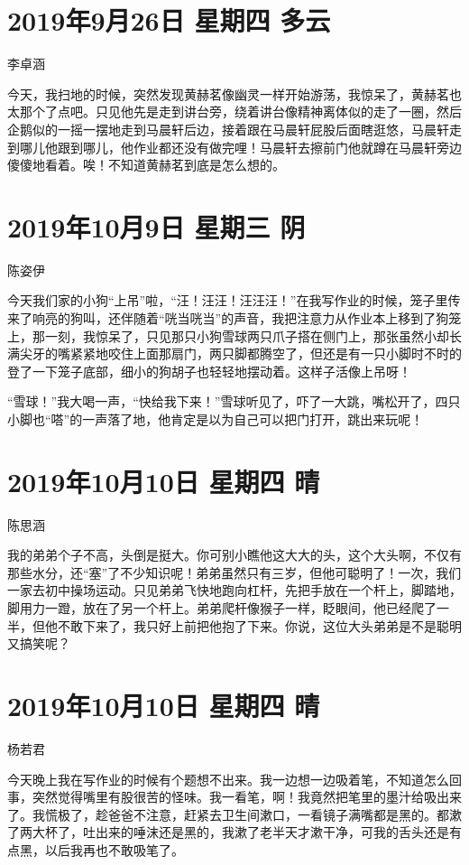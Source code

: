 \section{2019年9月26日 星期四 多云}

李卓涵

今天，我扫地的时候，突然发现黄赫茗像幽灵一样开始游荡，我惊呆了，黄赫茗也太那个了点吧。只见他先是走到讲台旁，绕着讲台像精神离体似的走了一圈，然后企鹅似的一摇一摆地走到马晨轩后边，接着跟在马晨轩屁股后面瞎逛悠，马晨轩走到哪儿他跟到哪儿，他作业都还没有做完哩！马晨轩去擦前门他就蹲在马晨轩旁边傻傻地看着。唉！不知道黄赫茗到底是怎么想的。

\section{2019年10月9日 星期三 阴}

陈姿伊

今天我们家的小狗``上吊''啦，``汪！汪汪！汪汪汪！''在我写作业的时候，笼子里传来了响亮的狗叫，还伴随着``咣当咣当''的声音，我把注意力从作业本上移到了狗笼上，那一刻，我惊呆了，只见那只小狗雪球两只爪子搭在侧门上，那张虽然小却长满尖牙的嘴紧紧地咬住上面那扇门，两只脚都腾空了，但还是有一只小脚时不时的登了一下笼子底部，细小的狗胡子也轻轻地摆动着。这样子活像上吊呀！

``雪球！''我大喝一声，``快给我下来！''雪球听见了，吓了一大跳，嘴松开了，四只小脚也``嗒''的一声落了地，他肯定是以为自己可以把门打开，跳出来玩呢！

\section{2019年10月10日 星期四 晴}

陈思涵

我的弟弟个子不高，头倒是挺大。你可别小瞧他这大大的头，这个大头啊，不仅有那些水分，还``塞''了不少知识呢！弟弟虽然只有三岁，但他可聪明了！一次，我们一家去初中操场运动。只见弟弟飞快地跑向杠杆，先把手放在一个杆上，脚踏地，脚用力一蹬，放在了另一个杆上。弟弟爬杆像猴子一样，眨眼间，他已经爬了一半，但他不敢下来了，我只好上前把他抱了下来。你说，这位大头弟弟是不是聪明又搞笑呢？

\section{2019年10月10日 星期四 晴}

杨若君

今天晚上我在写作业的时候有个题想不出来。我一边想一边吸着笔，不知道怎么回事，突然觉得嘴里有股很苦的怪味。我一看笔，啊！我竟然把笔里的墨汁给吸出来了。我慌极了，趁爸爸不注意，赶紧去卫生间漱口，一看镜子满嘴都是黑的。都漱了两大杯了，吐出来的唾沫还是黑的，我漱了老半天才漱干净，可我的舌头还是有点黑，以后我再也不敢吸笔了。

